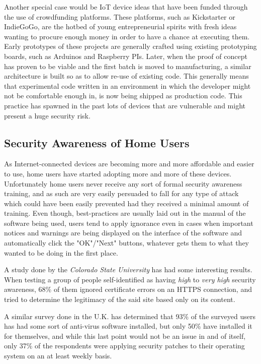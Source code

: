 \documentclass[a4paper,12pt]{article}
\begin{document}
	Another special case would be IoT device ideas that have been funded through the use of crowdfunding platforms. These platforms, such as Kickstarter or IndieGoGo, are the hotbed of young entrepreneurial spirits with fresh ideas wanting to procure enough money in order to have a chance at executing them. Early prototypes of these projects are generally crafted using existing prototyping boards, such as Arduinos and Raspberry PIs. Later, when the proof of concept has proven to be viable and the first batch is moved to manufacturing, a similar architecture is built so as to allow re-use of existing code. This generally means that experimental code written in an environment in which the developer might not be comfortable enough in, is now being shipped as production code. This practice has spawned in the past lots of devices that are vulnerable and might present a huge security risk.\cite{mstan14}
	
\subsection{Security Awareness of Home Users}
	
	As Internet-connected devices are becoming more and more affordable and easier to use, home users have started adopting more and more of these devices. Unfortunately home users never receive any sort of formal security awareness training, and as such are very easily persuaded to fall for any type of attack which could have been easily prevented had they received a minimal amount of training. Even though, best-practices are usually laid out in the manual of the software being used, users tend to apply ignorance\cite{jnielsen12} even in cases when important notices and warnings are being displayed on the interface of the software and automatically click the "OK"/"Next" buttons, whatever gets them to what they wanted to be doing in the first place.
	
	A study done by the \textit{Colorado State University} has had some interesting\cite{ahowe12} results. When testing a group of people self-identified as having \textit{high} to \textit{very high} security awareness, 68\% of them ignored certificate errors on an HTTPS connection, and tried to determine the legitimacy of the said site based only on its content.
	
	A similar survey done in the U.K. has determined\cite{sfurnell07} that 93\% of the surveyed users has had some sort of anti-virus software installed, but only 50\% have installed it for themselves, and while this last point would not be an issue in and of itself, only 37\% of the respondents were applying security patches to their operating system on an at least weekly basis.
	
\end{document}
